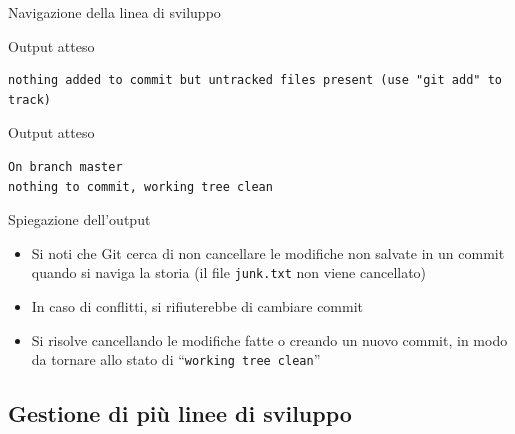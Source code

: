 \documentclass[presentation]{beamer}
\begin{document}
\begin{frame}{Navigazione della linea di sviluppo}
\begin{block}{Output atteso}
\begin{Verbatim}[fontsize=\scriptsize]
nothing added to commit but untracked files present (use "git add" to track)
		\end{Verbatim}
	\end{block}
	\begin{block}{Output atteso}
		\begin{Verbatim}[fontsize=\scriptsize]
On branch master
nothing to commit, working tree clean
		\end{Verbatim}
	\end{block}
	\begin{block}{Spiegazione dell'output}
		\begin{itemize}
			\item Si noti che Git cerca di non cancellare le modifiche non salvate in un commit quando si naviga la storia (il file \texttt{junk.txt} non viene cancellato)
			\item In caso di conflitti, si rifiuterebbe di cambiare commit
			\item Si risolve cancellando le modifiche fatte o creando un nuovo commit, in modo da tornare allo stato di ``\texttt{working tree clean}''
		\end{itemize}
	\end{block}
\end{frame}

\subsection{Gestione di più linee di sviluppo}
\end{document}
